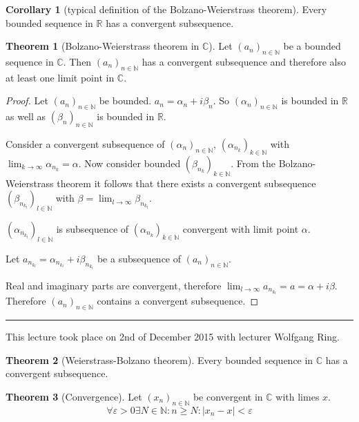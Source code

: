 \documentclass[a4paper,landscape,twocolumn]{article}
\theoremstyle{definition}
\newtheorem{theorem}{Theorem}
\newtheorem{cor}{Corollary}
\newcommand\abs[1]{\left|#1\right|}
\newcommand\seq[1]{{\left(#1\right)}_{n \in \mathbb N}}
\newcommand\meta[3]{\hrule{} This #1 took place on #2 with lecturer #3.\par}
\begin{document}
\begin{cor}[typical definition of the Bolzano-Weierstrass theorem]
  Every bounded sequence in $\mathbb R$ has a convergent subsequence.
\end{cor}

\begin{theorem}[Bolzano-Weierstrass theorem in $\mathbb C$]
  Let $\seq{a_n}$ be a bounded sequence in $\mathbb C$.
  Then $\seq{a_n}$ has a convergent subsequence and
  therefore also at least one limit point in $\mathbb C$.
\end{theorem}
\begin{proof}
  Let $\seq{a_n}$ be bounded. $a_n = \alpha_n + i \beta_n$.
  So $\seq{\alpha_n}$ is bounded in $\mathbb R$ as well as
  $\seq{\beta_n}$ is bounded in $\mathbb R$.

  Consider a convergent subsequence of $\seq{\alpha_n}$,
  $\left(\alpha_{n_k}\right)_{k \in \mathbb N}$ with
  $\lim_{k\to\infty} \alpha_{n_k} = \alpha$.
  Now consider bounded $\left(\beta_{n_k}\right)_{k \in \mathbb N}$.
  From the Bolzano-Weierstrass theorem it follows that there
  exists a convergent subsequence $\left(\beta_{n_{k_l}}\right)_{l \in \mathbb N}$
  with $\beta = \lim_{l\to\infty} \beta_{n_{k_l}}$.

  $\left(\alpha_{n_{k_l}}\right)_{l \in \mathbb N}$ is subsequence of
  $\left(\alpha_{n_k}\right)_{k \in \mathbb N}$
  convergent with limit point $\alpha$.

  Let $a_{n_{k_l}} = \alpha_{n_{k_l}} + i \beta_{n_{k_l}}$
  be a subsequence of $(a_n)_{n\in\mathbb N}$.

  Real and imaginary parts are convergent, therefore $\lim_{l\to\infty} a_{n_{k_l}} = a = \alpha + i \beta$.
  Therefore $\seq{a_n}$ contains a convergent subsequence.
\end{proof}

\meta{lecture}{2nd of December 2015}{Wolfgang Ring}
\begin{theorem}[Weierstrass-Bolzano theorem]
  Every bounded sequence in $\mathbb C$ has a convergent subsequence.
\end{theorem}

\begin{theorem}[Convergence]
  Let $(x_n)_{n \in \mathbb N}$ be convergent in $\mathbb C$ with limes $x$.
  \[ \forall \varepsilon > 0 \exists N \in \mathbb N: n \geq N: \abs{x_n - x} < \varepsilon \]
\end{theorem}
\end{document}
